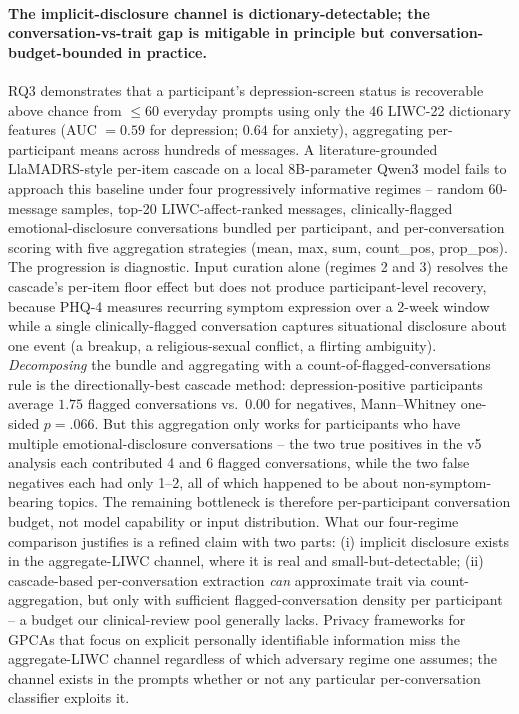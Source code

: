 \documentclass[letterpaper]{article}
\begin{document}
\paragraph{The implicit-disclosure channel is dictionary-detectable; the conversation-vs-trait gap is mitigable in principle but conversation-budget-bounded in practice.} RQ3 demonstrates that a participant's depression-screen status is recoverable above chance from $\leq 60$ everyday prompts using only the 46 LIWC-22 dictionary features (AUC $=0.59$ for depression; $0.64$ for anxiety), aggregating per-participant means across hundreds of messages. A literature-grounded LlaMADRS-style per-item cascade on a local 8B-parameter Qwen3 model fails to approach this baseline under four progressively informative regimes -- random 60-message samples, top-20 LIWC-affect-ranked messages, clinically-flagged emotional-disclosure conversations bundled per participant, and per-conversation scoring with five aggregation strategies (mean, max, sum, count\_pos, prop\_pos). The progression is diagnostic. Input curation alone (regimes 2 and 3) resolves the cascade's per-item floor effect but does not produce participant-level recovery, because PHQ-4 measures recurring symptom expression over a 2-week window while a single clinically-flagged conversation captures situational disclosure about one event (a breakup, a religious-sexual conflict, a flirting ambiguity). \emph{Decomposing} the bundle and aggregating with a count-of-flagged-conversations rule is the directionally-best cascade method: depression-positive participants average $1.75$ flagged conversations vs.\ $0.00$ for negatives, Mann--Whitney one-sided $p=.066$. But this aggregation only works for participants who have multiple emotional-disclosure conversations -- the two true positives in the v5 analysis each contributed 4 and 6 flagged conversations, while the two false negatives each had only 1--2, all of which happened to be about non-symptom-bearing topics. The remaining bottleneck is therefore per-participant conversation budget, not model capability or input distribution. What our four-regime comparison justifies is a refined claim with two parts: (i) implicit disclosure exists in the aggregate-LIWC channel, where it is real and small-but-detectable; (ii) cascade-based per-conversation extraction \emph{can} approximate trait via count-aggregation, but only with sufficient flagged-conversation density per participant -- a budget our clinical-review pool generally lacks. Privacy frameworks for GPCAs that focus on explicit personally identifiable information \citep{anon2026attachment,kwesi2025privacy} miss the aggregate-LIWC channel regardless of which adversary regime one assumes; the channel exists in the prompts whether or not any particular per-conversation classifier exploits it.
\end{document}
